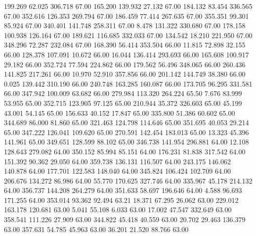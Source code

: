  199.269   62.025  306.718        67.00
 165.200  139.932   27.132        67.00
 184.132   83.454  336.565        67.00
 352.616  126.353  269.794        67.00
 186.459   77.414  267.635        67.00
 355.351   99.301   85.924        67.00
 340.401  141.748  258.311        67.00
   8.478  131.322  330.680        67.00
 178.158  100.938  126.164        67.00
 189.621  116.685  332.033        67.00
 134.542   18.210  221.950        67.00
 348.296   72.287  232.084        67.00
 168.390   56.414  353.504        66.00
  11.815   72.898   32.155        66.00
 128.378  107.091   10.672        66.00
  16.044  136.414  293.693        66.00
 165.608  100.917   29.182        66.00
 352.724   77.594  224.862        66.00
 179.562   56.496  348.065        66.00
 260.436  141.825  217.261        66.00
  10.970   52.910  357.856        66.00
 201.142  144.749   38.380        66.00
   0.025  139.442  310.190        66.00
 240.748  163.285  160.087        66.00
 173.705   96.295  331.581        66.00
 347.942  100.009   63.682        66.00
 279.984  113.320  264.224        65.50
   7.676   83.999   53.955        65.00
 352.715  123.905   97.125        65.00
 210.944   35.372  326.603        65.00
  45.199   43.001   54.145        65.00
 156.633   40.152   17.847        65.00
 335.800   51.386   60.602        65.00
 344.689   86.000   81.860        65.00
 321.463  124.798  114.646        65.00
 351.695   40.053   29.214        65.00
 347.222  126.041  109.620        65.00
 270.591  142.454  183.013        65.00
  13.323   45.396  141.961        65.00
 349.651  128.599   88.102        65.00
 346.738  141.954  296.881        64.00
  12.108  128.643  279.082        64.00
 350.152   85.994   85.151        64.00
 176.231   81.838  317.542        64.00
 151.392   90.362   29.050        64.00
 359.738  136.131  116.507        64.00
 243.175  146.062  140.878        64.00
 177.701  122.583  148.040        64.00
 345.824  106.424  102.709        64.00
 206.676  134.272   86.986        64.00
  55.770  170.625  327.746        64.00
 335.967   45.178  214.132        64.00
 356.737  144.208  264.279        64.00
 351.633   58.697  196.646        64.00
   4.588   96.693  171.255        64.00
 353.014   93.362   92.494        63.21
  18.371   67.295   26.062        63.00
 229.012  163.178  120.681        63.00
   5.041   55.108    6.033        63.00
  17.002   47.547  332.649        63.00
 358.541  111.226   27.909        63.00
 344.822   45.418   40.559        63.00
  20.702   29.463  136.379        63.00
 357.631   54.785   45.963        63.00
  36.201   21.520   88.766        63.00
